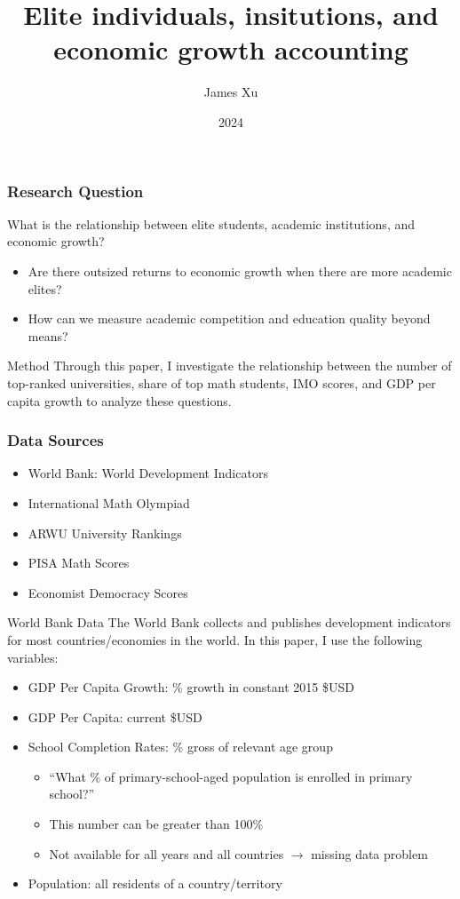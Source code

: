 \documentclass[10pt]{beamer}
\title{Elite individuals, insitutions, and economic growth accounting}
\author{James Xu}
\institute{ECON 442, Duke University}
\date{2024}
\begin{document}

\frame{\titlepage}

\begin{frame}
    \frametitle{Research Question}
    \begin{block}{What is the relationship between elite students, academic institutions, and economic growth?}
        \begin{itemize}
            \item Are there outsized returns to economic growth when there are more academic elites?
            \item How can we measure academic competition and education quality beyond means?
        \end{itemize}
    \end{block}
    \begin{exampleblock}{Method}
        Through this paper, I investigate the relationship between the number of top-ranked universities, share of top math students,
        IMO scores, and GDP per capita growth to analyze these questions.
    \end{exampleblock}
\end{frame}

\begin{frame}
\frametitle{Data Sources}
\begin{itemize}
    \item World Bank: World Development Indicators
    \item International Math Olympiad
    \item ARWU University Rankings
    \item PISA Math Scores
    \item Economist Democracy Scores
\end{itemize}
\end{frame}

\begin{frame}{World Bank Data}
    The World Bank collects and publishes development indicators for most countries/economies in the world. In this paper, I use the following variables:

    \begin{itemize}
        \item GDP Per Capita Growth: \% growth in constant 2015 \$USD
        \item GDP Per Capita: current \$USD
        \item School Completion Rates: \% gross of relevant age group
        \begin{itemize}
            \item ``What \% of primary-school-aged population is enrolled in primary school?''
            \item This number can be greater than 100\%
            \item Not available for all years and all countries $\rightarrow$ missing data problem
        \end{itemize}
        \item Population: all residents of a country/territory
    \end{itemize}
\end{frame}
\end{document}
